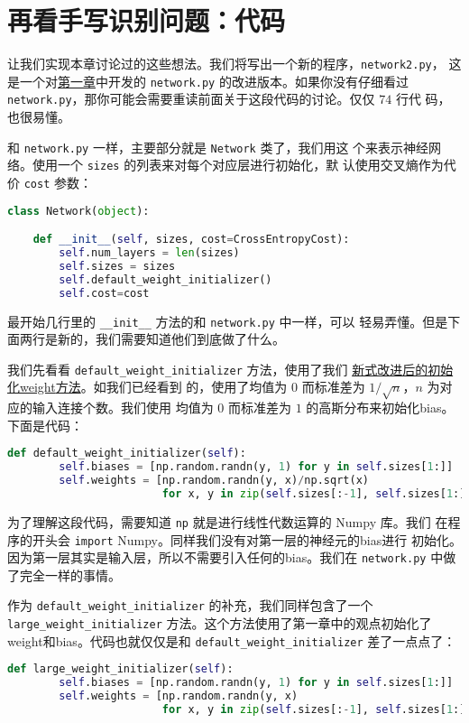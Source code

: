 \section{再看手写识别问题：代码}
\label{sec:handwriting_recognition_revisited_the_code}

让我们实现本章讨论过的这些想法。我们将写出一个新的程序，\lstinline!network2.py!，
这是一个对\hyperref[sec:implementing_our_network_to_classify_digits]{第一章}中开发的 \lstinline!network.py! 的改进版本。如果你没有仔细看过
\lstinline!network.py!，那你可能会需要重读前面关于这段代码的讨论。仅仅 $74$ 行代
码，也很易懂。

和 \lstinline!network.py! 一样，主要部分就是 \lstinline!Network! 类了，我们用这
个来表示神经网络。使用一个 \lstinline!sizes! 的列表来对每个对应层进行初始化，默
认使用交叉熵作为代价 \lstinline!cost! 参数：
\begin{lstlisting}[language=Python]
class Network(object):

    def __init__(self, sizes, cost=CrossEntropyCost):
        self.num_layers = len(sizes)
        self.sizes = sizes
        self.default_weight_initializer()
        self.cost=cost
\end{lstlisting}

最开始几行里的 \lstinline!__init__! 方法的和 \lstinline!network.py! 中一样，可以
轻易弄懂。但是下面两行是新的，我们需要知道他们到底做了什么。

我们先看看 \lstinline!default_weight_initializer! 方法，使用了我们%
\hyperref[sec:weight_initialization]{新式改进后的初始化\gls*{weight}方法}。如我们已经看到
的，使用了均值为 $0$ 而标准差为 $1/\sqrt{n}$，$n$ 为对应的输入连接个数。我们使用
均值为 $0$ 而标准差为 $1$ 的高斯分布来初始化\gls*{bias}。下面是代码：
\begin{lstlisting}[language=Python]
def default_weight_initializer(self):
        self.biases = [np.random.randn(y, 1) for y in self.sizes[1:]]
        self.weights = [np.random.randn(y, x)/np.sqrt(x) 
                        for x, y in zip(self.sizes[:-1], self.sizes[1:])]
\end{lstlisting}

为了理解这段代码，需要知道 \lstinline!np! 就是进行线性代数运算的 Numpy 库。我们
在程序的开头会 \lstinline!import! Numpy。同样我们没有对第一层的神经元的\gls*{bias}进行
初始化。因为第一层其实是输入层，所以不需要引入任何的\gls*{bias}。我们在
\lstinline!network.py! 中做了完全一样的事情。

作为 \lstinline!default_weight_initializer! 的补充，我们同样包含了一个
\lstinline!large_weight_initializer! 方法。这个方法使用了第一章中的观点初始化了
\gls*{weight}和\gls*{bias}。代码也就仅仅是和 \lstinline!default_weight_initializer! 差了一点点了：
\begin{lstlisting}[language=Python]
def large_weight_initializer(self):
        self.biases = [np.random.randn(y, 1) for y in self.sizes[1:]]
        self.weights = [np.random.randn(y, x) 
                        for x, y in zip(self.sizes[:-1], self.sizes[1:])]
\end{lstlisting}

